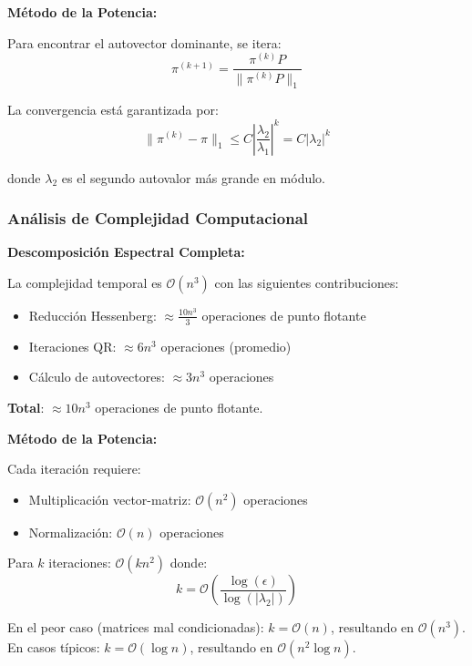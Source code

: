 \textbf{Método de la Potencia:}

Para encontrar el autovector dominante, se itera:
\begin{equation}
\pi^{(k+1)} = \frac{\pi^{(k)} P}{\|\pi^{(k)} P\|_1}
\end{equation}

La convergencia está garantizada por:
\begin{equation}
\|\pi^{(k)} - \pi\|_1 \leq C \left|\frac{\lambda_2}{\lambda_1}\right|^k = C |\lambda_2|^k
\end{equation}

donde $\lambda_2$ es el segundo autovalor más grande en módulo.

\subsubsection{Análisis de Complejidad Computacional}

\textbf{Descomposición Espectral Completa:}

La complejidad temporal es $\mathcal{O}(n^3)$ con las siguientes contribuciones:
\begin{itemize}
\item Reducción Hessenberg: $\approx \frac{10n^3}{3}$ operaciones de punto flotante
\item Iteraciones QR: $\approx 6n^3$ operaciones (promedio)
\item Cálculo de autovectores: $\approx 3n^3$ operaciones
\end{itemize}

\textbf{Total}: $\approx 10n^3$ operaciones de punto flotante.

\textbf{Método de la Potencia:}

Cada iteración requiere:
\begin{itemize}
\item Multiplicación vector-matriz: $\mathcal{O}(n^2)$ operaciones
\item Normalización: $\mathcal{O}(n)$ operaciones
\end{itemize}

Para $k$ iteraciones: $\mathcal{O}(kn^2)$ donde:
\begin{equation}
k = \mathcal{O}\left(\frac{\log(\epsilon)}{\log(|\lambda_2|)}\right)
\end{equation}

En el peor caso (matrices mal condicionadas): $k = \mathcal{O}(n)$, resultando en $\mathcal{O}(n^3)$.
En casos típicos: $k = \mathcal{O}(\log n)$, resultando en $\mathcal{O}(n^2 \log n)$.

